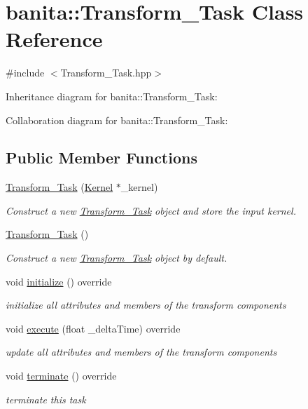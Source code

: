\hypertarget{classbanita_1_1_transform___task}{}\section{banita\+::Transform\+\_\+\+Task Class Reference}
\label{classbanita_1_1_transform___task}


{\ttfamily \#include $<$Transform\+\_\+\+Task.\+hpp$>$}



Inheritance diagram for banita\+::Transform\+\_\+\+Task\+:


Collaboration diagram for banita\+::Transform\+\_\+\+Task\+:
\subsection*{Public Member Functions}
\begin{DoxyCompactItemize}
\item 
\mbox{\hyperlink{classbanita_1_1_transform___task_aaf63d287eb134e3e8c8ad5f8ef792d43}{Transform\+\_\+\+Task}} (\mbox{\hyperlink{classbanita_1_1_kernel}{Kernel}} $\ast$\+\_\+kernel)
\begin{DoxyCompactList}\small\item\em Construct a new \mbox{\hyperlink{classbanita_1_1_transform___task}{Transform\+\_\+\+Task}} object and store the input kernel. \end{DoxyCompactList}\item 
\mbox{\hyperlink{classbanita_1_1_transform___task_ad475757b8d3298a37f4b89cc81b72b1f}{Transform\+\_\+\+Task}} ()
\begin{DoxyCompactList}\small\item\em Construct a new \mbox{\hyperlink{classbanita_1_1_transform___task}{Transform\+\_\+\+Task}} object by default. \end{DoxyCompactList}\item 
void \mbox{\hyperlink{classbanita_1_1_transform___task_ab94871acd76fbde7de99755cd6ac4e49}{initialize}} () override
\begin{DoxyCompactList}\small\item\em initialize all attributes and members of the transform components \end{DoxyCompactList}\item 
void \mbox{\hyperlink{classbanita_1_1_transform___task_a63ce627e86225d2264093ce932706074}{execute}} (float \+\_\+delta\+Time) override
\begin{DoxyCompactList}\small\item\em update all attributes and members of the transform components \end{DoxyCompactList}\item 
void \mbox{\hyperlink{classbanita_1_1_transform___task_a95d857713fec2b3bf90d64260be0a997}{terminate}} () override
\begin{DoxyCompactList}\small\item\em terminate this task \end{DoxyCompactList}\end{DoxyCompactItemize}

